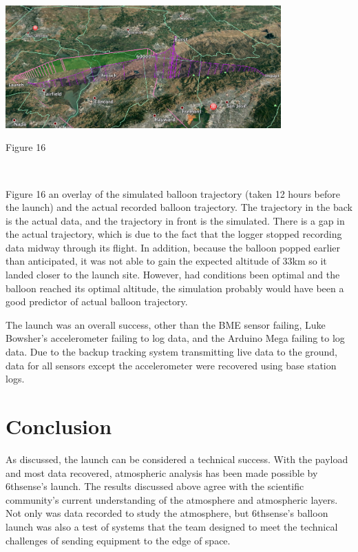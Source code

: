 \documentclass[12pt,]{article}
\begin{document}
\begin{center}\includegraphics[width=400px]{assets/kml} \end{center}

Figure 16

~

Figure 16 an overlay of the simulated balloon trajectory (taken 12 hours
before the launch) and the actual recorded balloon trajectory. The
trajectory in the back is the actual data, and the trajectory in front
is the simulated. There is a gap in the actual trajectory, which is due
to the fact that the logger stopped recording data midway through its
flight. In addition, because the balloon popped earlier than
anticipated, it was not able to gain the expected altitude of 33km so it
landed closer to the launch site. However, had conditions been optimal
and the balloon reached its optimal altitude, the simulation probably
would have been a good predictor of actual balloon trajectory.

The launch was an overall success, other than the BME sensor failing,
Luke Bowsher's accelerometer failing to log data, and the Arduino Mega
failing to log data. Due to the backup tracking system transmitting live
data to the ground, data for all sensors except the accelerometer were
recovered using base station logs.

\section{Conclusion}\label{conclusion}

As discussed, the launch can be considered a technical success. With the
payload and most data recovered, atmospheric analysis has been made
possible by 6thsense's launch. The results discussed above agree with
the scientific community's current understanding of the atmosphere and
atmospheric layers. Not only was data recorded to study the atmosphere,
but 6thsense's balloon launch was also a test of systems that the team
designed to meet the technical challenges of sending equipment to the
edge of space.
\end{document}
